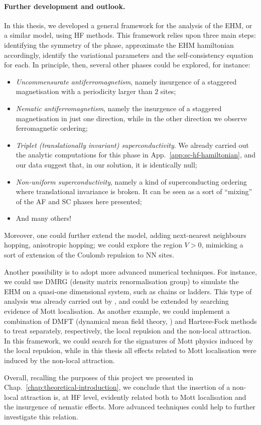 \paragraph{Further development and outlook.}

In this thesis, we developed a general framework for the analysis of the EHM, or a similar model, using HF methods. This framework relies upon three main steps: identifying the symmetry of the phase, approximate the EHM hamiltonian accordingly, identify the variational parameters and the self-consistency equation for each. In principle, then, several other phases could be explored, for instance:
\begin{itemize}
	\item \textit{Uncommensurate antiferromagnetism}, namely insurgence of a staggered magnetisation with a periodicity larger than $2$ sites;
	\item \textit{Nematic antiferromagnetism}, namely the insurgence of a staggered magnetisation in just one direction, while in the other direction we observe ferromagnetic ordering;
	\item \textit{Triplet (translationally invariant) superconductivity}. We already carried out the analytic computations for this phase in App.~\ref{app:sc-hf-hamiltonian}, and our data suggest that, in our solution, it is identically null;
	\item \textit{Non-uniform superconductivity}, namely a kind of superconducting ordering where translational invariance is broken. It can be seen as a sort of ``mixing'' of the AF and SC phases here presented;
	\item And many others!
\end{itemize}
Moreover, one could further extend the model, adding next-nearest neighbours hopping, anisotropic hopping; we could explore the region $V>0$, mimicking a sort of extension of the Coulomb repulsion to NN sites.

Another possibility is to adopt more advanced numerical techniques. For instance, we could use DMRG (density matrix renormalisation group) to simulate the EHM on a quasi-one dimensional system, such as chains or ladders. This type of analysis was already carried out by \citeauthor{padma2025beyond} \cite{padma2025beyond}, and could be extended by searching evidence of Mott localisation. As another example, we could implement a combination of DMFT (dynamical mean field theory, \cite{georges1996dynamical}) and Hartree-Fock methods to treat separately, respectively, the local repulsion and the non-local attraction. In this framework, we could search for the signatures of Mott physics induced by the local repulsion, while in this thesis all effects related to Mott localisation were induced by the non-local attraction.

Overall, recalling the purposes of this project we presented in Chap.~\ref{chap:theoretical-introduction}, we conclude that the insertion of a non-local attraction is, at HF level, evidently related both to Mott localisation and the insurgence of nematic effects. More advanced techniques could help to further investigate this relation.